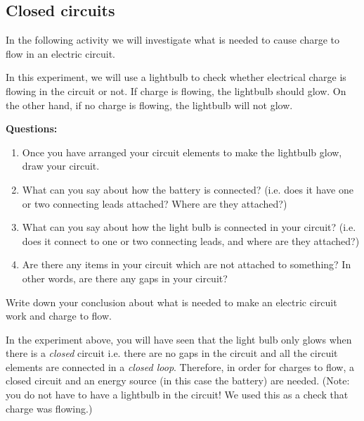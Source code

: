 \subsection{Closed circuits}
In the following activity we will investigate what is needed to cause charge to flow in an electric circuit.

{
In this experiment, we will use a lightbulb to check whether electrical charge is flowing in the circuit or not. If charge is flowing, the lightbulb should glow. On the other hand, if no charge is flowing, the lightbulb will not glow.



\noindent \textbf{Questions:}
\begin{enumerate}
\item Once you have arranged your circuit elements to make the lightbulb glow, draw your circuit.
\item What can you say about how the battery is connected? (i.e. does it have one or two connecting leads attached? Where are they attached?)
\item What can you say about how the light bulb is connected in your circuit? (i.e. does it connect to one or two connecting leads, and where are they attached?)
\item Are there any items in your circuit which are not attached to something? In other words, are there any gaps in your circuit?
\end{enumerate}

\noindent Write down your conclusion about what is needed to make an electric circuit work and charge to flow.
}

In the experiment above, you will have seen that the light bulb only glows when there is a \textit{closed} circuit i.e. there are no gaps in the circuit and all the circuit elements are connected in a \textit{closed loop}. Therefore, in order for charges to flow, a closed circuit and an energy source (in this case the battery) are needed. (Note: you do not have to have a lightbulb in the circuit! We used this as a check that charge was flowing.)


